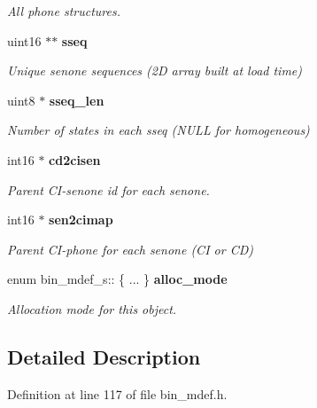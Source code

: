 \begin{DoxyCompactItemize}
\begin{DoxyCompactList}\small\item\em All phone structures. \end{DoxyCompactList}\item 
uint16 $\ast$$\ast$ {\bf sseq}\label{structbin__mdef__s_acb58480658812de7a357dcbd25ad7b41}

\begin{DoxyCompactList}\small\item\em Unique senone sequences (2\+D array built at load time) \end{DoxyCompactList}\item 
uint8 $\ast$ {\bf sseq\+\_\+len}\label{structbin__mdef__s_ab534bbd280015795b8e8ca4e296f4946}

\begin{DoxyCompactList}\small\item\em Number of states in each sseq (N\+U\+L\+L for homogeneous) \end{DoxyCompactList}\item 
int16 $\ast$ {\bf cd2cisen}\label{structbin__mdef__s_ad5e814ffa116c85d46359e3ffd40bff7}

\begin{DoxyCompactList}\small\item\em Parent C\+I-\/senone id for each senone. \end{DoxyCompactList}\item 
int16 $\ast$ {\bf sen2cimap}\label{structbin__mdef__s_a457e5352e52a57de5d1536bcd6b331a9}

\begin{DoxyCompactList}\small\item\em Parent C\+I-\/phone for each senone (C\+I or C\+D) \end{DoxyCompactList}\item 
enum bin\+\_\+mdef\+\_\+s\+:: \{ ... \}  {\bf alloc\+\_\+mode}
\begin{DoxyCompactList}\small\item\em Allocation mode for this object. \end{DoxyCompactList}\end{DoxyCompactItemize}


\subsection{Detailed Description}


Definition at line 117 of file bin\+\_\+mdef.\+h.



